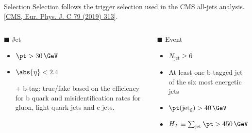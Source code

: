 \begin{frame}[fragile]{Selection}
  Selection follows the trigger selection used in the CMS \ttbar all-jets analysis.
  {\scriptsize \href{https://link.springer.com/article/10.1140\%2Fepjc\%2Fs10052-019-6788-2}{[CMS, Eur. Phys. J. C 79 (2019) 313]}}.

  \begin{columns}[T,onlytextwidth]
    \column{\textwidth}
    \begin{block}{$\blacksquare$ Jet}
      \begin{itemize}
        \item \( \pt > 30\,\GeV \)
        \item \( \abs{\eta} < 2.4 \)
        \item[+]  b-tag: true/fake based on the efficiency for b quark and
                  misidentification rates for gluon, light quark jets and c-jets.
      \end{itemize}
    \end{block}
    
    \begin{block}{$\blacksquare$ Event}
        \begin{itemize}
            \item $N_{\text{jet}} \ge 6$
            \item At least one b-tagged jet of the six most energetic jets
            \item ${\pt}(\text{jet}_{6}) > 40\,\GeV$
            \item $H_{T} \equiv \sum_{\textrm{jet}} {\pt} > 450\,\GeV$
        \end{itemize}
    \end{block}
  \end{columns}
\end{frame}

